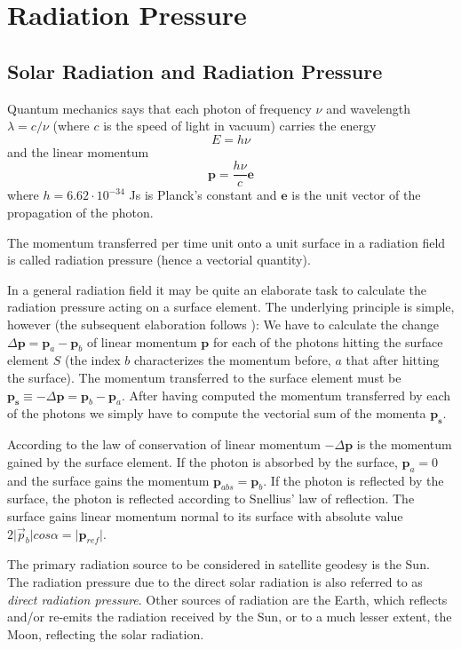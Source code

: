 \section{Radiation Pressure}
\subsection{Solar Radiation and Radiation Pressure}
Quantum mechanics says that each photon of frequency \(\nu\) and wavelength
\(\lambda = c / \nu\) (where \(c\) is the speed of light in vacuum) carries the energy
\begin{equation}
    E = h \nu
\end{equation}
and the linear momentum
\begin{equation}
    \bm{p} = \frac{h \nu}{c} \bm{e}
\end{equation}
where \(h=6.62\cdot10^{-34}\) Js is Planck's constant and \(\bm{e}\) is the unit 
vector of the propagation of the photon.

The momentum transferred per time unit onto a unit surface in a radiation
ﬁeld is called radiation pressure (hence a vectorial quantity).

In a general radiation ﬁeld it may be quite an elaborate task to calculate
the radiation pressure acting on a surface element. The underlying principle
is simple, however (the subsequent elaboration follows \cite{BeutlerVII}): 
We have to calculate the change \(\Delta \bm{p} = \bm{p}_a -\bm{p}_b\) of 
linear momentum \(\bm{p}\) for each of the photons hitting the surface element 
\(S\) (the index \(b\) characterizes the momentum before, \(a\) that after 
hitting the surface). The momentum transferred to the surface element must be 
\(\bm{p_s} \equiv - \Delta \bm{p} = \bm{p}_b -\bm{p}_a \).
After having computed the momentum transferred by each of the photons
we simply have to compute the vectorial sum of the momenta \(\bm{p_s}\).

According to the law of conservation of linear momentum \(-\Delta \bm{p}\) is 
the momentum gained by the surface element. If the photon is absorbed by the surface, 
\(\bm{p}_a = 0\) and the surface gains the momentum \(\bm{p}_{abs} = \bm{p}_b\).
If the photon is reﬂected by the surface, the photon is reﬂected according to Snellius' law
of reﬂection. The surface gains linear momentum normal to its surface with
absolute value \(2 \lvert \vec{p}_b \rvert cos\alpha = \lvert \bm{p}_{ref} \rvert\).

The primary radiation source to be considered in satellite geodesy is the
Sun. The radiation pressure due to the direct solar radiation is also referred
to as \emph{direct radiation pressure}. Other sources of radiation are the Earth, which
reﬂects and/or re-emits the radiation received by the Sun, or to a much lesser
extent, the Moon, reﬂecting the solar radiation.

